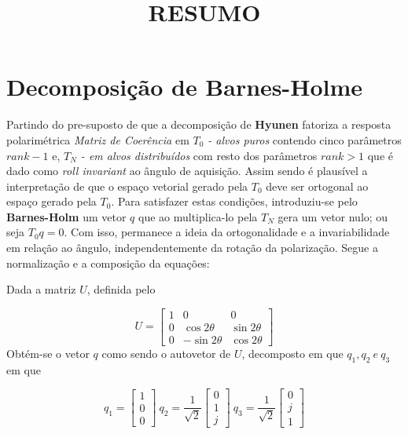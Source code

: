 \documentclass{article}
\date{}
\title{RESUMO}
\begin{document}
\maketitle

\section{Decomposição de Barnes-Holme}

Partindo do pre-suposto de que a decomposição de \textbf{Hyunen} fatoriza a resposta polarimétrica \textit{Matriz de Coerência} em \textit{$T_{0}$ - alvos puros} contendo cinco parâmetros \textit{$rank - 1$} e, \textit{$T_{N}$ - em alvos distribuídos} com resto dos parâmetros \textit{$rank > 1$} que é dado como \textit{roll invariant} ao ângulo de aquisição. Assim sendo é plausível a interpretação de que o espaço vetorial gerado pela \textit{$T_{0}$} deve ser ortogonal ao espaço gerado pela \textit{$T_{0}$}. Para satisfazer estas condições, introduziu-se pelo \textbf{Barnes-Holm} um vetor $q$ que ao multiplica-lo  pela $T_{N}$ gera um vetor nulo; ou seja $T_{0}q = 0$. Com isso, permanece a ideia da ortogonalidade e a invariabilidade em relação ao ângulo, independentemente da rotação da polarização. Segue a normalização e a composição da equações:

Dada a matriz $U$, definida pelo

    \begin{equation}
        U = \begin{bmatrix}
            1 & 0 & 0 \\
            0 & \cos{2\theta} & \sin{2\theta} \\
            0 & -\sin{2\theta} & \cos{2\theta}
        \end{bmatrix}
    \end{equation} 
Obtém-se o vetor $q$ como sendo o autovetor de $U$, decomposto em que $q_{1}, q_{2} \ e \ q_{3}$ em que

    \begin{equation}
        q_{1} =\begin{bmatrix}
            1 \\
            0 \\
            0
        \end{bmatrix} \ 
        q_{2} = \frac{1}{\sqrt{2}}\begin{bmatrix}
            0 \\
            1 \\
            j
        \end{bmatrix} \ 
        q_{3} = \frac{1}{\sqrt{2}}\begin{bmatrix}
            0 \\
            j \\
            1
        \end{bmatrix}
    \end{equation}
    
\end{document}
